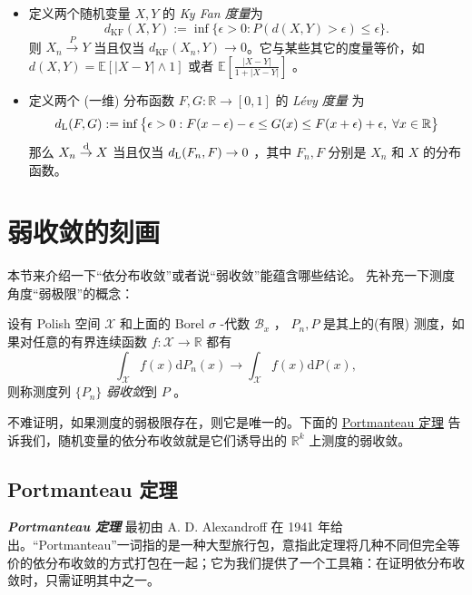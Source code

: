 \begin{itemize}
\tightlist
\item
  定义两个随机变量 $X,Y$ 的 \emph{Ky Fan 度量}为
  \[
  d_{\text{KF}}(X,Y):=\inf\big\{\epsilon>0:P(d(X,Y)>\epsilon)\le\epsilon\big\}.
  \]
  则 $X_n\overset P\to Y$ 当且仅当 $d_{\text{KF}}(X_n,Y)\to 0$。它与某些其它的度量等价，如 $d(X,Y)=\mathbb{E}[|X-Y|\wedge 1]$ 或者 $\mathbb{E}\left[\frac{|X-Y|}{1+|X-Y|}\right]$ 。%
\item
  定义两个 (一维) 分布函数 $F,G:\mathbb R\to[0,1]$ 的 \emph{Lévy 度量 }为\[ d_{\rm L}(F,G):=\inf\big\{\epsilon >0:F(x-\epsilon )-\epsilon \leq G(x)\leq F(x+\epsilon )+\epsilon ,\;\forall x\in \mathbb {R}\big\} \]那么 $X_n\overset{\rm d}\to X$ 当且仅当 $d_{\rm L}(F_n,F)\to 0$ ，其中 $F_n,F$ 分别是 $X_n$ 和 $X$ 的分布函数。%
\end{itemize}

\section{弱收敛的刻画}

本节来介绍一下``依分布收敛''或者说``弱收敛''能蕴含哪些结论。
先补充一下测度角度``弱极限''的概念：
\begin{definition}\label{def:ch1:weak-convergence}
设有 Polish 空间 $\mathscr X$ 和上面的 Borel $\sigma$ -代数 $\mathscr B_x$ ， $P_n,P$ 是其上的(有限) 测度，如果对任意的有界连续函数 $f:\mathscr X\to \mathbb R$ 都有
\[
\int_{\mathscr X}f(x)\mathrm dP_n(x)\to \int_{\mathscr X}f(x)\mathrm dP(x),
\]
则称测度列 $\{P_n\}$ \emph{弱收敛}到 $P$ 。
\end{definition}
不难证明，如果测度的弱极限存在，则它是唯一的。下面的 \hyperref[thm:ch1:portmanteau]{Portmanteau 定理} 告诉我们，随机变量的依分布收敛就是它们诱导出的 $\mathbb R^k$ 上测度的弱收敛。

\subsection{Portmanteau 定理}

\textbf{\emph{Portmanteau 定理 }}最初由 A. D. Alexandroff 在 1941 年给出。``Portmanteau''一词指的是一种大型旅行包，意指此定理将几种不同但完全等价的依分布收敛的方式打包在一起；它为我们提供了一个工具箱：在证明依分布收敛时，只需证明其中之一。

